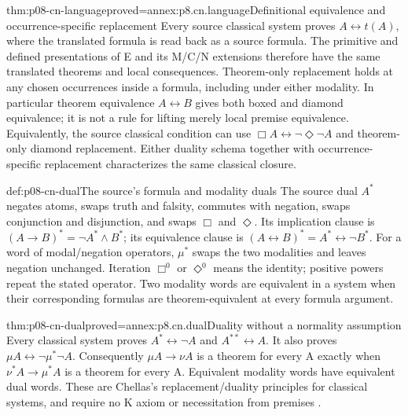\begin{hbtheorem}{thm:p08-cn-language}{proved=annex:p8.cn.language}{Definitional equivalence and occurrence-specific replacement}
Every source classical system proves \(A\leftrightarrow t(A)\),
where the translated formula is read back as a source formula.
The primitive and defined presentations of E and its M/C/N extensions
therefore have the same translated theorems and local consequences.
Theorem-only replacement holds at any chosen occurrences inside a formula,
including under either modality. In particular theorem equivalence
\(A\leftrightarrow B\) gives both boxed and diamond equivalence;
it is not a rule for lifting merely local premise equivalence.
Equivalently, the source classical condition can use
\(\Box A\leftrightarrow\neg\Diamond\neg A\) and
theorem-only diamond replacement. Either duality schema together
with occurrence-specific replacement characterizes the same
classical closure.
\end{hbtheorem}

\begin{hbdefinition}{def:p08-cn-dual}{The source's formula and modality duals}
The source dual \(A^*\) negates atoms, swaps truth and falsity,
commutes with negation, swaps conjunction and disjunction, and swaps
\(\Box\) and \(\Diamond\). Its implication clause is
\((A\to B)^*=\neg A^*\land B^*\); its equivalence clause is
\((A\leftrightarrow B)^*=A^*\leftrightarrow\neg B^*\).
For a word of modal/negation operators, \(\mu^*\) swaps the two
modalities and leaves negation unchanged. Iteration \(\Box^0\)
or \(\Diamond^0\) means the identity; positive powers repeat
the stated operator.
Two modality words are equivalent in a system when their
corresponding formulas are theorem-equivalent at every formula argument.
\end{hbdefinition}

\begin{hblemma}{thm:p08-cn-dual}{proved=annex:p8.cn.dual}{Duality without a normality assumption}
Every classical system proves \(A^*\leftrightarrow\neg A\)
and \(A^{**}\leftrightarrow A\). It also proves
\(\mu A\leftrightarrow\neg\mu^*\neg A\).
Consequently \(\mu A\to\nu A\) is a theorem for every A
exactly when \(\nu^*A\to\mu^*A\) is a theorem for every A.
Equivalent modality words have equivalent dual words.
These are Chellas's replacement/duality principles for classical systems,
and require no K axiom or necessitation from premises
\cite[theorems~8.2--8.6, pp.~232--234]{Chellas1980}.
\end{hblemma}

